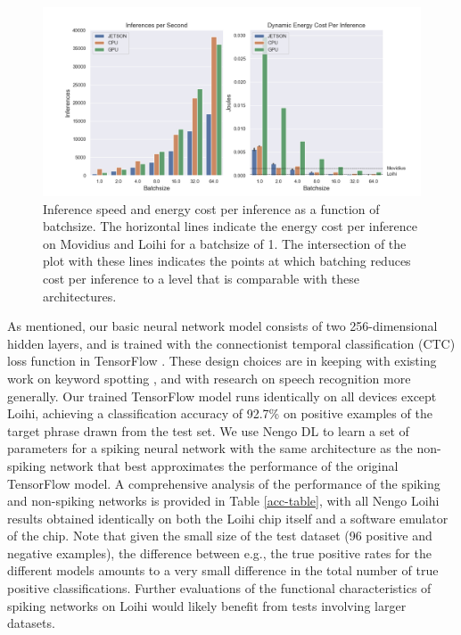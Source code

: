 \documentclass[sigconf, screen]{acmart}
\begin{document}
\begin{figure}[ht!]
\centering
    \includegraphics[width=6.5in]{./figures/batch_comparison.png}
    \caption{Inference speed and energy cost per inference as a function of batchsize. The horizontal lines indicate the energy cost per inference on Movidius and Loihi for a batchsize of 1. The intersection of the plot with these lines indicates the points at which batching reduces cost per inference to a level that is comparable with these architectures.}
\label{batchsize_fig}
\end{figure}

As mentioned, our basic neural network model consists of two 256-dimensional hidden layers, and is trained with the connectionist temporal classification (CTC) loss function \cite{Graves:2006} in TensorFlow \cite{Abadi:2016}. These design choices are in keeping with existing work on keyword spotting \cite{Chen:2014}, and with research on speech recognition more generally. Our trained TensorFlow model runs identically on all devices except Loihi, achieving a classification accuracy of 92.7\% on positive examples of the target phrase drawn from the test set. We use Nengo DL \citep{Rasmussen:2018} to learn a set of parameters for a spiking neural network with the same architecture as the non-spiking network that best approximates the performance of the original TensorFlow model. A comprehensive analysis of the performance of the spiking and non-spiking networks is provided in Table \ref{acc-table}, with all Nengo Loihi results obtained identically on both the Loihi chip itself and a software emulator of the chip. Note that given the small size of the test dataset (96 positive and negative examples), the difference between e.g., the true positive rates for the different models amounts to a very small difference in the total number of true positive classifications. Further evaluations of the functional characteristics of spiking networks on Loihi would likely benefit from tests involving larger datasets. 
\end{document}
